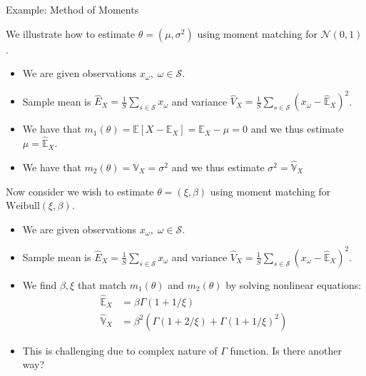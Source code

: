 \documentclass[handout,9pt]{beamer}
\begin{document}
%
\begin{frame}{Example: Method of Moments}

We illustrate how to estimate $\theta=(\mu,\sigma^2)$ using moment matching for $\mathcal{N}(0,1)$.
\begin{itemize}
\setlength{\itemsep}{10pt}
\item We are given observations $x_\omega,\; \omega \in \mathcal{S}$.
\item Sample mean is $\hat{E}_X=\frac{1}{S}\sum_{s\in\mathcal{S}}x_\omega$ and variance $\hat{V}_X=\frac{1}{S}\sum_{s\in\mathcal{S}}(x_\omega-\hat{\mathbb{E}}_X)^2$. 
\item We have that $m_1(\theta)=\mathbb{E}[X-\mathbb{E}_X]=\mathbb{E}_X-\mu=0$ and we thus estimate $\mu=\hat{\mathbb{E}}_X$.
\item We have that $m_2(\theta)=\mathbb{V}_X=\sigma^2$ and we thus estimate $\sigma^2=\hat{\mathbb{V}}_X$
\end{itemize}
Now consider we wish to estimate $\theta=(\xi,\beta)$ using moment matching for $\textrm{Weibull}(\xi,\beta)$. 
\begin{itemize}
\item We are given observations $x_\omega,\; \omega \in \mathcal{S}$.
\item Sample mean is $\hat{E}_X=\frac{1}{S}\sum_{s\in\mathcal{S}}x_\omega$ and variance $\hat{V}_X=\frac{1}{S}\sum_{s\in\mathcal{S}}(x_\omega-\hat{\mathbb{E}}_X)^2$. 
\item We find $\beta,\xi$ that match $m_1(\theta)$ and $m_2(\theta)$ by solving nonlinear equations:
\begin{align*}
\hat{\mathbb{E}}_X&=\beta\Gamma(1+1/\xi)\\
\hat{\mathbb{V}}_X&=\beta^2\left(\Gamma(1+2/\xi)+\Gamma(1+1/\xi)^2\right)
\end{align*}
\item This is challenging due to complex nature of $\Gamma$ function.  Is there another way?
\end{itemize}
\end{frame}
\end{document}
